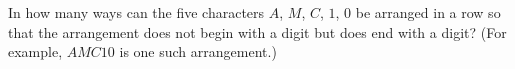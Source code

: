 In how many ways can the five characters $A$, $M$, $C$, $1$, $0$ be arranged in a row so that the arrangement does not begin with a digit but does end with a digit? (For example, $AMC10$ is one such arrangement.)

